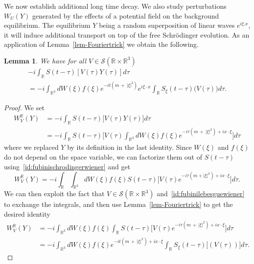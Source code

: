 \documentclass[10pt]{amsart}
\newtheorem{lemm}[theo]{Lemma}\newtheorem{prop}[theo]{Proposition}\newtheorem{coro}[theo]{Corollary}\newtheorem{conj}[theo]{Conjecture}
\theoremstyle{definition}\newtheorem{defi}[theo]{Definition}\newtheorem{rema}[theo]{Remark}\newtheorem{exam}[theo]{Example}\newtheorem{exem}[theo]{Example}\newtheorem{nota}[theo]{Notation}
\newcommand{\R}{\mathbb{R}}
\newcommand{\mclS}{\mathcal{S}}
\begin{document}
We now establish additional long time decay. We also study perturbations $W_U(Y)$ generated by the effects of a potential field on the background equilibrium. The equilibrium $Y$ being a random superposition of linear waves $e^{i\xi.x}$, it will induce additional transport on top of the free Schr\"odinger evolution. As an application of Lemma~\ref{lem-Fouriertrick} we obtain the following.


\begin{lemm}\label{lem:expressionWVY}
We have for all $V \in \mclS(\R\times \R^3)$
\begin{multline*}
-i\int_{\R} S(t-\tau) [V(\tau) Y(\tau)] d\tau \\= -i \int_{\R^3} dW(\xi) f(\xi) e^{-it\left(m\,+\,|\xi|^2\right)} e^{i\xi \cdot x} \int_{\R} S_\xi (t-\tau) \Big(V(\tau)\Big) d\tau.
\end{multline*}
\end{lemm}

\begin{proof}
We set
\begin{equation}\label{def:mathcalWV}
\begin{split}
 W_V^{\R}(Y) &= -i \int_{\R} S(t-\tau) \Big[V(\tau) Y(\tau) \Big] d\tau \\
& = -i \int_{\R}S(t-\tau)\Big[V(\tau) \int_{\R^3} dW(\xi) f(\xi) e^{-i\tau\left(m\,+\,|\xi|^2\right) + ix\cdot \xi} \Big] d\tau
\end{split}
\end{equation}
where we replaced $Y$ by its definition in the last identity. Since $W(\xi)$ and $f(\xi)$ do not depend on the space variable, we can factorize them out of $S(t-\tau)$ using~\eqref{id:fubinischrodingerwiener} and get
\[
W_V^{\R}(Y) = -i \int_{\R} \int_{\R^3} dW(\xi) f(\xi) S(t-\tau)\Big[V(\tau) e^{-i\tau(m+|\xi|^2) + ix\cdot \xi} \Big] d\tau.
\]
We can then exploit the fact that $V \in \mclS(\R\times \R^3)$ and~\eqref{id:fubinilebesguewiener} to exchange the integrals, and then use Lemma~\ref{lem-Fouriertrick} to get the desired identity
\begin{align*}
W_V^{\R}(Y) &= -i \int_{\R^3} dW(\xi) f(\xi) \int_{\R} S(t-\tau)\Big[V(\tau) e^{-i\tau\left(m\,+\,|\xi|^2\right) + ix\cdot \xi} \Big] d\tau\\
&=-i \int_{\R^3} dW(\xi) f(\xi) e^{-it\left(m\,+\,|\xi|^2\right) + ix\cdot \xi} \int_{\R} S_\xi (t-\tau)\Big[(V(\tau)) \Big] d\tau.
\end{align*}
\end{proof}
\end{document}
